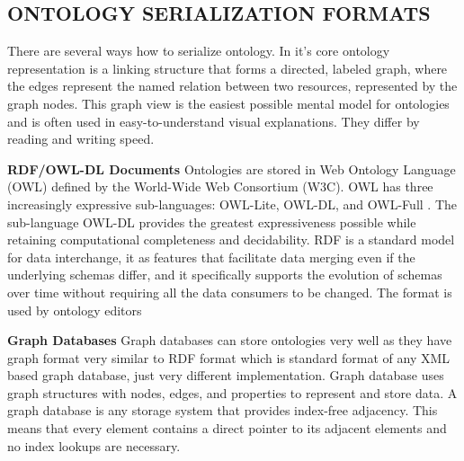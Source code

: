 \subsection{ONTOLOGY SERIALIZATION FORMATS}

There are several ways how to serialize ontology. In it's core ontology representation is a linking structure that forms a directed, labeled graph, where the edges represent the named relation between two resources, represented by the graph nodes. This graph view is the easiest possible mental model for ontologies and is often used in easy-to-understand visual explanations. They differ by reading and writing speed. 


\textbf{RDF/OWL-DL Documents}
Ontologies are stored in Web Ontology Language (OWL) defined by the World-Wide Web Consortium (W3C). OWL has three increasingly expressive sub-languages: OWL-Lite, OWL-DL, and OWL-Full \cite{OWL}. The sub-language OWL-DL provides the greatest expressiveness possible while retaining computational completeness and decidability. RDF is a standard model for data interchange, it as features that facilitate data merging even if the underlying schemas differ, and it specifically supports the evolution of schemas over time without requiring all the data consumers to be changed. The format is used by ontology editors

\textbf{Graph Databases}
Graph databases can store ontologies very well as they have graph format very similar to RDF format which is standard format of any XML based graph database, just very different implementation. Graph database uses graph structures with nodes, edges, and properties to represent and store data. A graph database is any storage system that provides index-free adjacency. This means that every element contains a direct pointer to its adjacent elements and no index lookups are necessary.




